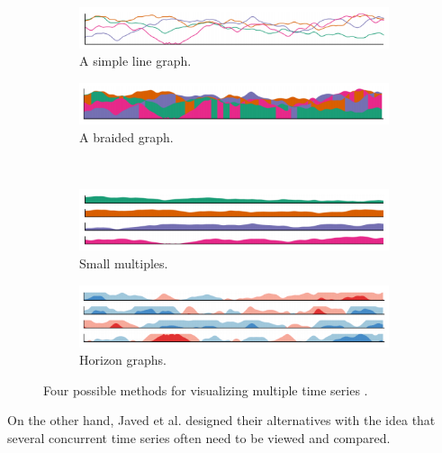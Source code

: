\documentclass{article} %
\begin{document}
\begin{figure}
        \centering
        \begin{subfigure}[b]{0.4\textwidth}
                \includegraphics[width=\textwidth]{figures/ts_simplelinegraph.png}
                \caption{A simple line graph.}
                \label{fig:ts_simple}
        \end{subfigure}
        \begin{subfigure}[b]{0.4\textwidth}
                \includegraphics[width=\textwidth]{figures/ts_braidedgraph.png}
                \caption{A braided graph.}
                \label{fig:ts_braid}
        \end{subfigure}
        \\
        \begin{subfigure}[b]{0.4\textwidth}
                \includegraphics[width=\textwidth]{figures/ts_smallmultiples.png}
                \caption{Small multiples.}
                \label{fig:ts_smmult}
        \end{subfigure}
        \begin{subfigure}[b]{0.4\textwidth}
                \includegraphics[width=\textwidth]{figures/ts_horizongraphs.png}
                \caption{Horizon graphs.}
                \label{fig:ts_horizon}
        \end{subfigure}
        \caption{Four possible methods for visualizing multiple time series \cite{javed2010}.}
        \label{fig:ts_compare}
\end{figure}

On the other hand, Javed et al. designed their alternatives with the idea that several concurrent time series often need to be viewed and compared.




\end{document}
